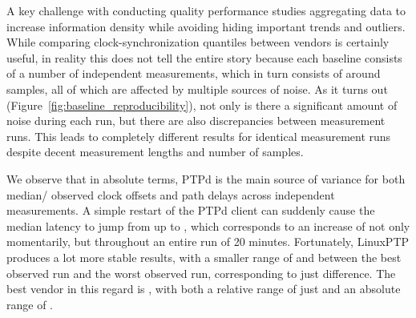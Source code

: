 {
\renewcommand{\ptpKeyPrefix}{/reproducibility/rpi-4}



\newcommand{\numBaselineMeasurements}{10}
\newcommand{\baselineTotalMinutesRuntime}{\numBaselineMeasurements*4*2*20}
\newcommand{\numSamplesPerRunApprox}{\fpeval{round(20*60)}}

A key challenge with conducting quality performance studies aggregating data to increase information density while avoiding hiding important trends and outliers. While comparing clock-synchronization quantiles between vendors is certainly useful, in reality this does not tell the entire story because each baseline consists of a number of independent measurements, which in turn consists of around \numSamplesPerRunApprox{} samples, all of which are affected by multiple sources of noise. As it turns out (Figure~\ref{fig:baseline_reproducibility}), not only is there a significant amount of noise during each run, but there are also discrepancies between measurement runs. This leads to completely different results for identical measurement runs despite decent measurement lengths and number of samples.

We observe that in absolute terms, PTPd is the main source of variance for both median/\PNineFive{} observed clock offsets and path delays across independent measurements. A simple restart of the PTPd client can suddenly cause the median latency to jump from  up to , which corresponds to an increase of  not only momentarily, but throughout an entire run of 20 minutes.
Fortunately, LinuxPTP produces a lot more stable results, with a smaller range of  and  between the best observed run and the worst observed run, corresponding to just  difference. The best vendor in this regard is \fVendor{\cmpMinArg}, with both a relative range of just \fRelative{\cmpMin} and an absolute range of .
%
%

}
